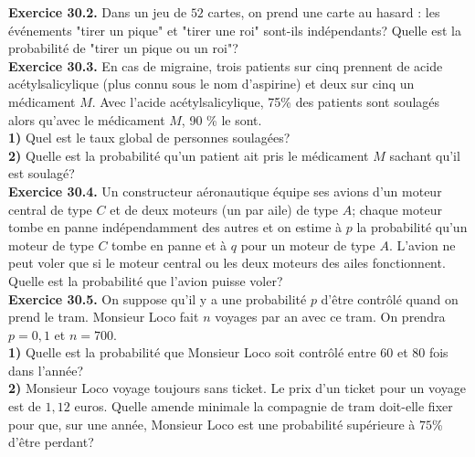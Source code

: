 \documentclass[a4paper,12pt,francais]{article}
\begin{document}
\noindent
{\bf Exercice 30.2.} Dans un jeu de $52$ cartes, on prend une carte au hasard : les événements "tirer un pique" et "tirer une roi" sont-ils indépendants? Quelle est la probabilité de "tirer un pique ou un roi"?\\

\noindent
{\bf Exercice 30.3.} En cas de migraine, trois patients sur cinq prennent de acide acétylsalicylique (plus connu sous le nom d'aspirine) et deux sur cinq un médicament $M$. Avec l'acide acétylsalicylique, 75\% des patients sont soulagés alors qu'avec le médicament $M$, 90 \% le sont.\\
{\bf 1)} Quel est le taux global de personnes soulagées?\\
{\bf 2)} Quelle est la probabilité qu'un patient ait pris le médicament $M$ sachant qu'il est soulagé?\\

\noindent
{\bf Exercice 30.4.} Un constructeur aéronautique équipe ses avions d'un moteur central de type $C$ et de deux moteurs (un par aile) de type $A$; chaque moteur tombe en panne indépendamment des autres et on estime à $p$ la probabilité qu'un moteur de type $C$ tombe en panne et à $q$ pour un moteur de type $A$. L'avion ne peut voler que si le moteur central ou les deux moteurs des ailes fonctionnent. Quelle est la probabilité que l'avion puisse voler?\\

\noindent
{\bf Exercice 30.5.} On suppose qu'il y a une probabilité $p$ d'être contrôlé quand on prend le tram. Monsieur Loco fait $n$ voyages par an avec ce tram. On prendra $p=0,1$ et $n=700$.\\
{\bf 1)} Quelle est la probabilité que Monsieur Loco soit contrôlé entre $60$ et $80$ fois dans l'année?\\
{\bf 2)} Monsieur Loco voyage toujours sans ticket. Le prix d'un ticket pour un voyage est de $1,12$ euros. Quelle amende minimale la compagnie de tram doit-elle fixer pour que, sur une année, Monsieur Loco est une probabilité supérieure à $75$\% d'être perdant?\\
\end{document}
